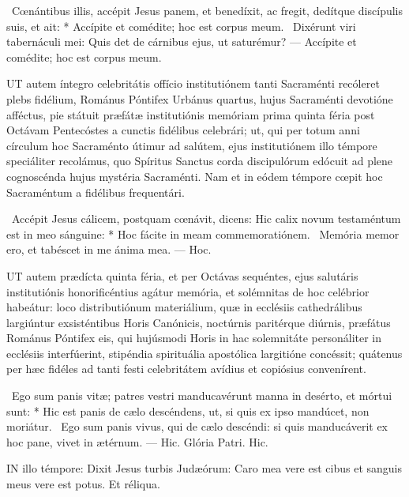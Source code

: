 \R\ Cœnántibus illis, accépit Jesus panem, et benedíxit, ac fregit, dedítque discípulis suis, et ait: * Accípite et comédite; hoc est corpus meum. \V\ Dixérunt viri tabernáculi mei: Quis det de cárnibus ejus, ut saturémur? --- Accípite et comédite; hoc est corpus meum.


\lettrine[lines=2]{U}{T} autem íntegro celebritátis offício institutiónem tanti Sacraménti recóleret plebs fidélium, Románus Póntifex Urbánus quartus, hujus Sacraménti devotióne afféctus, pie státuit præfátæ institutiónis memóriam prima quinta féria post Octávam Pentecóstes a cunctis fidélibus celebrári; ut, qui per totum anni círculum hoc Sacraménto útimur ad salútem, ejus institutiónem illo témpore speciáliter recolámus, quo Spíritus Sanctus corda discipulórum edócuit ad plene cognoscénda hujus mystéria Sacraménti. Nam et in eódem témpore cœpit hoc Sacraméntum a fidélibus frequentári.

\R\ Accépit Jesus cálicem, postquam cœnávit, dicens: Hic calix novum testaméntum est in meo sánguine: * Hoc fácite in meam commemoratiónem. \V\ Memória memor ero, et tabéscet in me ánima mea. --- Hoc.


\lettrine[lines=2]{U}{T} autem prædícta quinta féria, et per Octávas sequéntes, ejus salutáris institutiónis honorificéntius agátur memória, et solémnitas de hoc celébrior habeátur: loco distributiónum materiálium, quæ in ecclésiis cathedrálibus largiúntur exsisténtibus Horis Canónicis, noctúrnis paritérque diúrnis, præfátus Románus Póntifex eis, qui hujúsmodi Horis in hac solemnitáte personáliter in ecclésiis interfúerint, stipéndia spirituália apostólica largitióne concéssit; quátenus per hæc fidéles ad tanti festi celebritátem avídius et copiósius convenírent.

\R\ Ego sum panis vitæ; patres vestri manducavérunt manna in desérto, et mórtui sunt: * Hic est panis de cælo descéndens, ut, si quis ex ipso mandúcet, non moriátur. \V\ Ego sum panis vivus, qui de cælo descéndi: si quis manducáverit ex hoc pane, vivet in ætérnum. --- Hic. Glória Patri. Hic.




\lettrine[lines=2]{I}{N} illo témpore: Dixit Jesus turbis Judæórum: Caro mea vere est cibus et sanguis meus vere est potus. Et réliqua.

